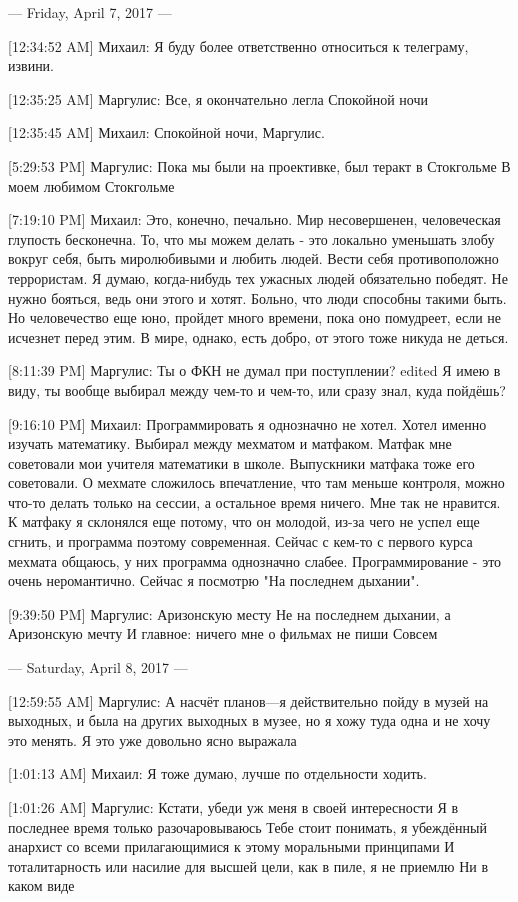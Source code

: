 \documentclass{article}
\begin{document}
--- Friday, April 7, 2017 ---

[12:34:52 AM] Михаил:
Я буду более ответственно относиться к телеграму, извини.

[12:35:25 AM] Маргулис:
Все, я окончательно легла
 Спокойной ночи

[12:35:45 AM] Михаил:
Спокойной ночи, Маргулис.

[5:29:53 PM] Маргулис:
Пока мы были на проективке, был теракт в Стокгольме
 В моем любимом Стокгольме

[7:19:10 PM] Михаил:
Это, конечно, печально. Мир несовершенен, человеческая глупость бесконечна. То, что мы можем делать - это локально уменьшать злобу вокруг себя, быть миролюбивыми и любить людей. Вести себя противоположно террористам.
Я думаю, когда-нибудь тех ужасных людей обязательно победят.
Не нужно бояться, ведь они этого и хотят.
 Больно, что люди способны такими быть. Но человечество еще юно, пройдет много времени, пока оно помудреет, если не исчезнет перед этим.
 В мире, однако, есть добро, от этого тоже никуда не деться.

[8:11:39 PM] Маргулис:
Ты о ФКН не думал при поступлении?
edited 
Я имею в виду, ты вообще выбирал между чем-то и чем-то, или сразу знал, куда пойдёшь?

[9:16:10 PM] Михаил:
Программировать я однозначно не хотел. Хотел именно изучать математику. Выбирал между мехматом и матфаком. Матфак мне советовали мои учителя математики в школе. Выпускники матфака тоже его советовали. О мехмате сложилось впечатление, что там меньше контроля, можно что-то делать только на сессии, а остальное время ничего. Мне так не нравится. К матфаку я склонялся еще потому, что он молодой, из-за чего не успел еще сгнить, и программа поэтому современная.
 Сейчас с кем-то с первого курса мехмата общаюсь, у них программа однозначно слабее.
 Программирование - это очень неромантично.
 Сейчас я посмотрю "На последнем дыхании".

[9:39:50 PM] Маргулис:
Аризонскую месту
 Не на последнем дыхании, а Аризонскую мечту
 И главное: ничего мне о фильмах не пиши
 Совсем

--- Saturday, April 8, 2017 ---

[12:59:55 AM] Маргулис:
А насчёт планов—я действительно пойду в музей на выходных, и была на других выходных в музее, но я хожу туда одна и не хочу это менять. Я это уже довольно ясно выражала

[1:01:13 AM] Михаил:
Я тоже думаю, лучше по отдельности ходить.

[1:01:26 AM] Маргулис:
Кстати, убеди уж меня в своей интересности
 Я в последнее время только разочаровываюсь
 Тебе стоит понимать, я убеждённый анархист со всеми прилагающимися к этому моральными принципами
 И тоталитарность или насилие для высшей цели, как в пиле, я не приемлю
 Ни в каком виде
\end{document}
